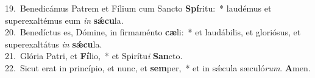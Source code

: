 {19.~}Benedicámus Patrem et Fílium cum Sancto \textbf{Spí}ritu:~* laudémus et superexaltémus eum \textit{in} \textbf{sǽ}\textbf{cu}la.\\
{20.~}Benedíctus es, Dómine, in firmaménto \textbf{cæ}li:~* et laudábilis, et gloriósus, et superexaltátus \textit{in} \textbf{sǽ}\textbf{cu}la.\\
{21.~}Glória Patri, et \textbf{Fí}lio,~* et Spirítu\textit{i} \textbf{San}cto.\\
{22.~}Sicut erat in princípio, et nunc, et \textbf{sem}per,~* et in sǽcula sæculó\textit{rum}. \textbf{A}men.\\
